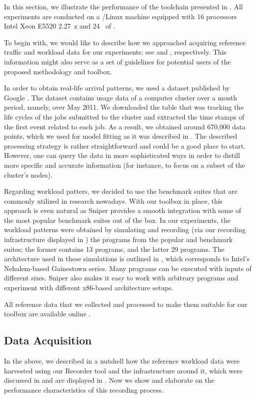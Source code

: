 In this section, we illustrate the performance of the toolchain presented in
. All experiments are conducted on a /Linux machine
equipped with 16 processors Intel Xeon E5520 2.27~z and 24~ of
.

To begin with, we would like to describe how we approached acquiring reference
traffic and workload data for our experiments; see  and
, respectively. This information might also serve as a set of
guidelines for potential users of the proposed methodology and toolbox.

In order to obtain real-life arrival patterns, we used a dataset published by
Google \cite{google}. The dataset contains usage data of a computer cluster over
a month period, namely, over May 2011. We downloaded the table that was tracking
the life cycles of the jobs submitted to the cluster and extracted the time
stamps of the first event related to each job. As a result, we obtained around
670,000 data points, which we used for model fitting as it was described in
. The described processing strategy is rather straightforward and
could be a good place to start. However, one can query the data in more
sophisticated ways in order to distill more specific and accurate information
(for instance, to focus on a subset of the cluster's nodes).


Regarding workload patters, we decided to use the benchmark suites that are
commonly utilized in research nowadays. With our toolbox in place, this approach
is even natural as Sniper provides a smooth integration with some of the most
popular benchmark suites out of the box. In our experiments, the workload
patterns were obtained by simulating and recording (via our recording
infrastructure displayed in ) the programs from the popular
 \cite{bienia2011} and  \cite{cpu2006} benchmark
suites; the former contains 13 programs, and the latter 29 programs. The
architecture used in these simulations is outlined in , which
corresponds to Intel's Nehalem-based Gainestown series. Many programs can be
executed with inputs of different sizes. Sniper also makes it easy to work with
arbitrary programs and experiment with different x86-based architecture setups.

All reference data that we collected and processed to make them suitable for our
toolbox are available online \cite{sources}.

\subsection{Data Acquisition}

In the above, we described in a nutshell how the reference workload data were
harvested using our Recorder tool and the infrastructure around it, which were
discussed in  and are displayed in . Now we show
and elaborate on the performance characteristics of this recording process.

